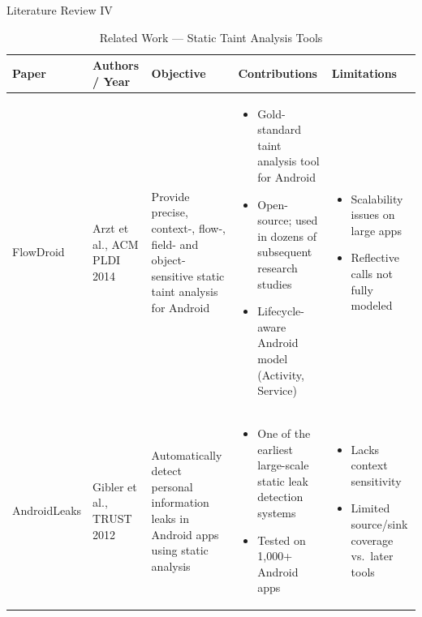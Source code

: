 \documentclass[aspectratio=169]{beamer}
\begin{document}
\begin{frame}{Literature Review IV}
\begin{table}[ht]
    \centering
    \caption{Related Work — Static Taint Analysis Tools}
    \tiny
    \begin{tabular}{|p{0.6in}|p{0.65in}|p{1.0in}|p{1.3in}|p{1.3in}|}
    \hline
    \textbf{Paper} & \textbf{Authors / Year} & \textbf{Objective} &
    \textbf{Contributions} & \textbf{Limitations} \\
    \hline
    \vspace{1mm}
    FlowDroid &
    Arzt et al., ACM PLDI 2014 &
    Provide precise, context-, flow-, field- and object-sensitive static taint analysis for Android &
    \begin{itemize}
        \item Gold-standard taint analysis tool for Android
        \item Open-source; used in dozens of subsequent research studies
        \item Lifecycle-aware Android model (Activity, Service)
    \end{itemize} &
    \begin{itemize}
        \item Scalability issues on large apps
        \item Reflective calls not fully modeled
    \end{itemize} \\
    \hline
    \vspace{1mm}
    AndroidLeaks &
    Gibler et al., TRUST 2012 &
    Automatically detect personal information leaks in Android apps using static analysis &
    \begin{itemize}
        \item One of the earliest large-scale static leak detection systems
        \item Tested on 1,000+ Android apps
    \end{itemize} &
    \begin{itemize}
        \item Lacks context sensitivity
        \item Limited source/sink coverage vs.\ later tools
    \end{itemize} \\
    \hline
    \end{tabular}
\end{table}
\end{frame}
\end{document}
